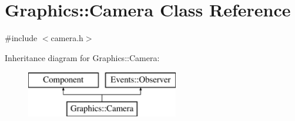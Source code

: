 \hypertarget{class_graphics_1_1_camera}{}\section{Graphics\+:\+:Camera Class Reference}
\label{class_graphics_1_1_camera}


{\ttfamily \#include $<$camera.\+h$>$}

Inheritance diagram for Graphics\+:\+:Camera\+:\begin{figure}[H]
\begin{center}
\leavevmode
\includegraphics[height=2.000000cm]{class_graphics_1_1_camera}
\end{center}
\end{figure}
